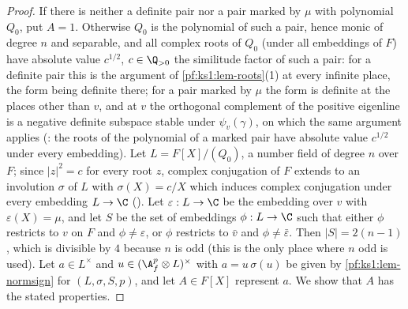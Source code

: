 \begin{proof}
If there is neither a definite pair nor a pair marked by $\mu$ with polynomial $Q_0$, put $A=1$. Otherwise $Q_0$ is the
polynomial of such a pair, hence monic of degree $n$ and separable, and all complex roots of $Q_0$ (under all embeddings of $F$) have absolute value $c^{1/2}$, $c\in\Q_{>0}$ the similitude factor
of such a pair: for a definite pair this is the argument of \cref{pf:ks1:lem-roots}(1) at every infinite place, the form being definite there; for a
pair marked by $\mu$ the form is definite at the places other than $v$, and at $v$ the orthogonal complement of the positive eigenline is a negative
definite subspace stable under $\psi_v(\gamma)$, on which the same argument applies
(: the roots of the polynomial of a marked pair have absolute value
$c^{1/2}$ under every embedding). Let $L=F[X]/(Q_0)$, a number field of degree $n$ over $F$; since
$|z|^2=c$ for every root $z$, complex conjugation of $F$ extends to an involution $\sigma$ of $L$ with $\sigma(X)=c/X$ which induces complex
conjugation under every embedding $L\to\C$ (). Let $\varepsilon:L\to\C$ be the
embedding over $v$ with $\varepsilon(X)=\mu$, and let $S$ be the set of embeddings $\phi:L\to\C$ such that either $\phi$ restricts to $v$ on $F$
and $\phi\neq\varepsilon$, or $\phi$ restricts to $\bar v$ and $\phi\neq\bar\varepsilon$. Then $|S|=2(n-1)$, which is divisible by $4$ because
$n$ is odd (this is the only place where $n$ odd is used). Let $a\in L^\times$ and $u\in(\ksoneAfp\otimes L)^\times$ with $a=u\,\sigma(u)$ be given by \cref{pf:ks1:lem-normsign} for $(L,\sigma,S,p)$, and
let $A\in F[X]$ represent $a$. We show that $A$ has the stated properties.


\end{proof}
